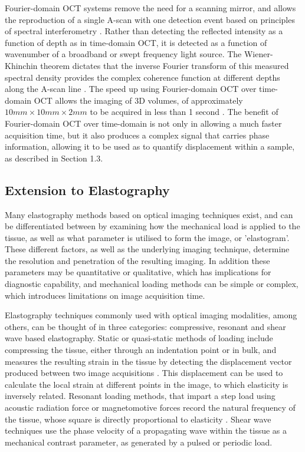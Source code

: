 Fourier-domain OCT systems remove the need for a scanning mirror, and allows the reproduction of a single A-scan with one detection event based on principles of spectral interferometry \cite{chin_parametric_2016}. Rather than detecting the reflected intensity as a function of depth as in time-domain OCT, it is detected as a function of wavenumber of a broadband or swept frequency light source. The Wiener-Khinchin theorem dictates that the inverse Fourier transform of this measured spectral density provides the complex coherence function at different depths along the A-scan line \cite{schmitt_optical_1999}. The speed up using Fourier-domain OCT over time-domain OCT allows the imaging of 3D volumes, of approximately $10mm \times 10mm \times 2mm$ to be acquired in less than 1 second \cite{kennedy_emergence_2017}. The benefit of Fourier-domain OCT over time-domain is not only in allowing a much faster acquisition time, but it also produces a complex signal that carries phase information, allowing it to be used as to quantify displacement within a sample, as described in Section 1.3.

\subsection{Extension to Elastography}
Many elastography methods based on optical imaging techniques exist, and can be differentiated between by examining how the mechanical load is applied to the tissue, as well as what parameter is utilised to form the image, or 'elastogram'. These different factors, as well as the underlying imaging technique, determine the resolution and penetration of the resulting imaging. In addition these parameters may be quantitative or qualitative, which has implications for diagnostic capability, and mechanical loading methods can be simple or complex, which introduces limitations on image acquisition time.

Elastography techniques commonly used with optical imaging modalities, among others, can be thought of in three categories: compressive, resonant and shear wave based elastography. Static or quasi-static methods of loading include compressing the tissue, either through an indentation point or in bulk, and measures the resulting strain in the tissue by detecting the displacement vector produced between two image acquisitions \cite{kennedy_optical_2014}. This displacement can be used to calculate the local strain at different points in the image, to which elasticity is inversely related. Resonant loading methods, that impart a step load using acoustic radiation force or magnetomotive forces record the natural frequency of the tissue, whose square is directly proportional to elasticity \cite{kennedy_optical_2015}. Shear wave techniques use the phase velocity of a propagating wave within the tissue as a mechanical contrast parameter, as generated by a pulsed or periodic load. 


